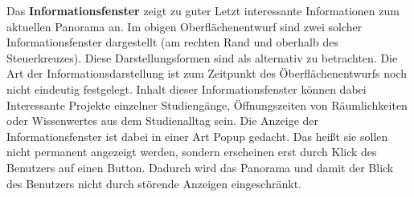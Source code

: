 Das \textbf{Informationsfenster} zeigt zu guter Letzt interessante Informationen zum aktuellen Panorama an. Im obigen Oberflächenentwurf sind zwei solcher Informationsfenster dargestellt (am rechten Rand und oberhalb des Steuerkreuzes). Diese Darstellungsformen sind als alternativ zu betrachten. Die Art der Informationsdarstellung ist zum Zeitpunkt des Öberflächenentwurfs noch nicht eindeutig festgelegt. Inhalt dieser Informationsfenster können dabei Interessante Projekte einzelner Studiengänge, Öffnungszeiten von Räumlichkeiten oder Wissenwertes aus dem Studienalltag sein. Die Anzeige der Informationsfenster ist dabei in einer Art Popup gedacht. Das heißt sie sollen nicht permanent angezeigt werden, sondern erscheinen erst durch Klick des Benutzers auf einen Button. Dadurch wird das Panorama und damit der Blick des Benutzers nicht durch störende Anzeigen eingeschränkt.